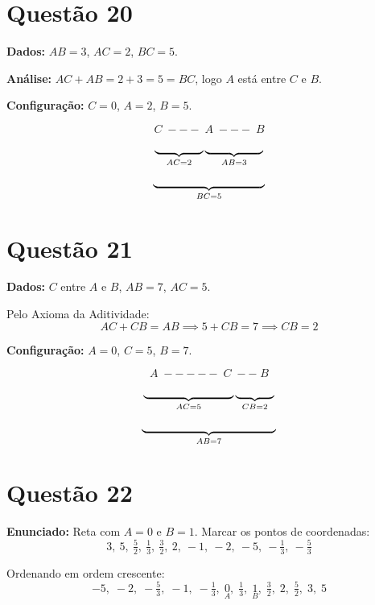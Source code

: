\documentclass[12pt,a4paper]{article}
\begin{document}
\section*{Quest\~ao 20}

\textbf{Dados:} $AB = 3$, $AC = 2$, $BC = 5$.

\textbf{An\'alise:} $AC + AB = 2 + 3 = 5 = BC$, logo $A$ est\'a entre $C$ e $B$.

\textbf{Configura\c{c}\~ao:} $C = 0$, $A = 2$, $B = 5$.

$$C \;{-}{-}{-}\; A \;{-}{-}{-}\; B$$
$$\underbrace{\hspace{1.5cm}}_{AC=2}\underbrace{\hspace{1.8cm}}_{AB=3}$$
$$\underbrace{\hspace{3.5cm}}_{BC=5}$$

\section*{Quest\~ao 21}

\textbf{Dados:} $C$ entre $A$ e $B$, $AB = 7$, $AC = 5$.

Pelo Axioma da Aditividade:
$$AC + CB = AB \implies 5 + CB = 7 \implies CB = 2$$

\textbf{Configura\c{c}\~ao:} $A = 0$, $C = 5$, $B = 7$.

$$A \;{-}{-}{-}{-}{-}\; C \;{-}{-}\; B$$
$$\underbrace{\hspace{2.8cm}}_{AC=5}\underbrace{\hspace{1.2cm}}_{CB=2}$$
$$\underbrace{\hspace{4.2cm}}_{AB=7}$$

\section*{Quest\~ao 22}

\textbf{Enunciado:} Reta com $A = 0$ e $B = 1$. Marcar os pontos de coordenadas:
$$3,\ 5,\ \tfrac{5}{2},\ \tfrac{1}{3},\ \tfrac{3}{2},\ 2,\ -1,\ -2,\ -5,\ -\tfrac{1}{3},\ -\tfrac{5}{3}$$

Ordenando em ordem crescente:
$$-5,\; -2,\; -\tfrac{5}{3},\; -1,\; -\tfrac{1}{3},\; \underset{A}{0},\; \tfrac{1}{3},\; \underset{B}{1},\; \tfrac{3}{2},\; 2,\; \tfrac{5}{2},\; 3,\; 5$$
\end{document}
